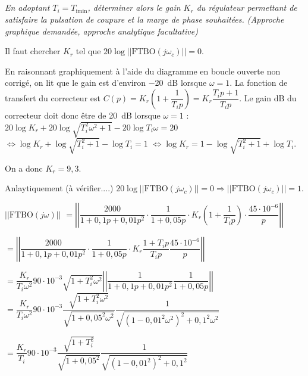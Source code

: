 \begin{multicols}{2}
\begin{corrige}
\end{corrige}
\else
\fi


\subparagraph{}\textit{En adoptant $T_{i}=T_{\text{imin}}$, déterminer alors le gain $K_r$ du régulateur permettant de satisfaire la pulsation de coupure et la marge de phase souhaitées. (Approche graphique demandée, approche analytique facultative)}

\begin{methode}
Il faut chercher $K_r$ tel que $20\log||\text{FTBO}(j\omega_c)||=0$.
\end{methode}
\ifprof


\ifprof
\begin{corrige}
En raisonnant graphiquement à l'aide du diagramme en boucle ouverte non corrigé, on lit que le gain est d'environ \SI{-20}{dB} lorsque $\omega=1$. La fonction de transfert du correcteur est 
$C(p)=K_r  \left(1+\dfrac{1}{T_i p} \right)=K_r  \dfrac{T_i p+1}{T_i p} $. Le gain dB du correcteur doit donc être de \SI{20}{dB} lorsque $\omega=1$ :
$20\log K_r  +20\log \sqrt{T_i^2 \omega^2 + 1}- 20\log T_i \omega =20$
$\Leftrightarrow \log K_r  +\log \sqrt{T_i^2  + 1}- \log T_i  =1$
$\Leftrightarrow \log K_r   =1-\log \sqrt{T_i^2  + 1}+ \log T_i $. 

On a donc $K_r = 9,3$. 

\vspace{1cm}
Anlaytiquement (à vérifier....)
$20\log||\text{FTBO}(j\omega_c)||=0 \Rightarrow ||\text{FTBO}(j\omega_c)||=1$.

$\left|\left| \text{FTBO}\left( j \omega\right)\right|\right|$ 
$ = \left|\left|
{\dfrac{2000}{1+0,1p+0,01p^2}}
\cdot
{\dfrac{1}{1+0,05p}}
\cdot 
{K_r}
 \left(1+\dfrac{1}{T_i p} \right) \cdot 
\dfrac{45\cdot 10^{-6}}{p}
\right|\right| $

$ = \left|\left|
{\dfrac{2000}{1+0,1p+0,01p^2}}
\cdot
{\dfrac{1}{1+0,05p}}
\cdot 
{K_r}
 \dfrac{1+T_i p}{T_i p} 
\dfrac{45\cdot 10^{-6}}{p}
\right|\right| $

$ =  \dfrac{K_r}{T_i\omega^2}  90\cdot 10^{-3}  \sqrt{1+T_i^2\omega^2}\left|\left|
\dfrac{1}{1+0,1p+0,01p^2}
\dfrac{1}{1+0,05p}
\right|\right| $
$ =  \dfrac{K_r}{T_i\omega^2}  90\cdot 10^{-3}  
\dfrac{\sqrt{1+T_i^2\omega^2}}{\sqrt{1+0,05^2 \omega^2}}
\dfrac{1}{\sqrt{\left(1-0,01^2\omega^2\right)^2+0,1^2\omega^2}} $

$ =  \dfrac{K_r}{T_i}  90\cdot 10^{-3}  
\dfrac{\sqrt{1+T_i^2}}{\sqrt{1+0,05^2 }}
\dfrac{1}{\sqrt{\left(1-0,01^2\right)^2+0,1^2}} $

\end{corrige}
\else
\fi



\end{multicols}
